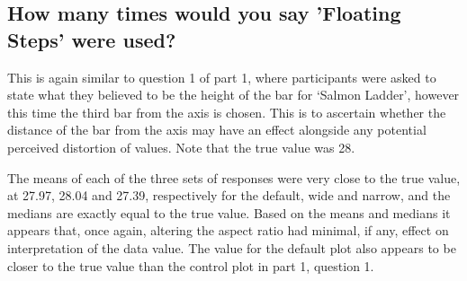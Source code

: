 \documentclass[
]{article}
\newenvironment{Shaded}{\begin{snugshade}}{\end{snugshade}}
\newcommand{\DecValTok}[1]{\textcolor[rgb]{0.00,0.00,0.81}{#1}}
\newcommand{\KeywordTok}[1]{\textcolor[rgb]{0.13,0.29,0.53}{\textbf{#1}}}
\newcommand{\NormalTok}[1]{#1}
\newcommand{\OperatorTok}[1]{\textcolor[rgb]{0.81,0.36,0.00}{\textbf{#1}}}
\newcommand{\StringTok}[1]{\textcolor[rgb]{0.31,0.60,0.02}{#1}}
\begin{document}
\subsection{How many times would you say 'Floating Steps' were used?}

This is again similar to question 1 of part 1, where participants were
asked to state what they believed to be the height of the bar for
`Salmon Ladder', however this time the third bar from the axis is
chosen. This is to ascertain whether the distance of the bar from the
axis may have an effect alongside any potential perceived distortion of
values. Note that the true value was 28.

\begin{Shaded}
\end{Shaded}

The means of each of the three sets of responses were very close to the
true value, at 27.97, 28.04 and 27.39, respectively for the default,
wide and narrow, and the medians are exactly equal to the true value.
Based on the means and medians it appears that, once again, altering the
aspect ratio had minimal, if any, effect on interpretation of the data
value. The value for the default plot also appears to be closer to the
true value than the control plot in part 1, question 1.
\end{document}
